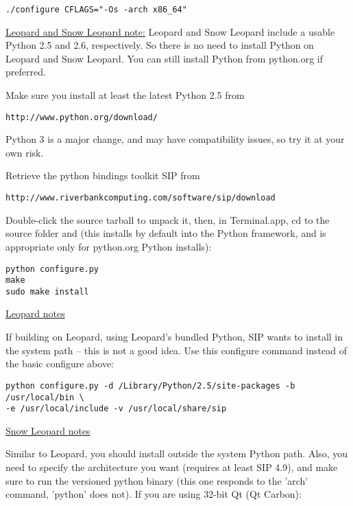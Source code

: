 \begin{verbatim}
./configure CFLAGS="-Os -arch x86_64"
\end{verbatim}

\underline{Leopard and Snow Leopard note:} Leopard and Snow Leopard include a usable
Python 2.5 and 2.6, respectively. So there is no need to install Python on
Leopard and Snow Leopard. You can still install Python from python.org if preferred.

Make sure you install at least the latest Python 2.5 from 

\begin{verbatim}
http://www.python.org/download/
\end{verbatim}

Python 3 is a major change, and may have compatibility issues, so try it at your own risk.

Retrieve the python bindings toolkit SIP from

\begin{verbatim}
http://www.riverbankcomputing.com/software/sip/download
\end{verbatim}

Double-click the source tarball to unpack it, then, in Terminal.app, cd to the source folder
and (this installs by default into the Python framework, and is appropriate only for python.org Python installs):

\begin{verbatim}
python configure.py 
make 
sudo make install 
\end{verbatim}

\underline{Leopard notes}

If building on Leopard, using Leopard's bundled Python, SIP wants to install in the
system path -- this is not a good idea.  Use this configure command instead of the 
basic configure above:

\begin{verbatim}
python configure.py -d /Library/Python/2.5/site-packages -b /usr/local/bin \
-e /usr/local/include -v /usr/local/share/sip
\end{verbatim}

\underline{Snow Leopard notes}

Similar to Leopard, you should install outside the system Python path.
Also, you need to specify the architecture you want (requires at least SIP 4.9),
and make sure to run the versioned python binary (this one responds to the
'arch' command, 'python' does not). If you are using 32-bit Qt (Qt Carbon):

